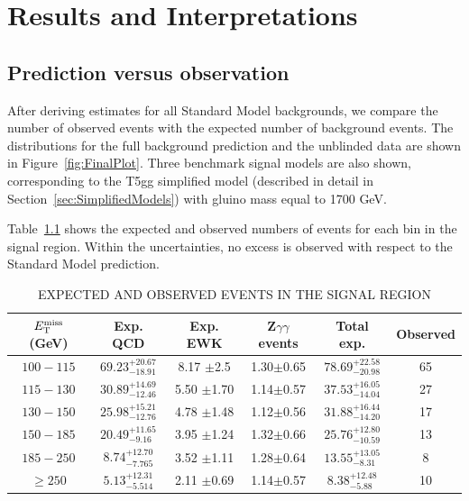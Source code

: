 \chapter{Results and Interpretations}
\label{chap:Results}


\section{Prediction versus observation}
\label{sec:fullCount}
After deriving estimates for all Standard Model backgrounds, we compare the number of 
observed events with the expected number of background events. 
The \ETmiss distributions for the full background prediction and the unblinded data are
shown in Figure~\ref{fig:FinalPlot}. Three benchmark signal models are also shown, 
corresponding to the T5gg simplified model 
(described in detail in Section~\ref{sec:SimplifiedModels}) with gluino mass equal to 1700 GeV.

Table~\ref{tab:ExpObs} shows the expected and observed numbers of events for each bin in the signal region.
Within the uncertainties, no excess is observed with respect to the Standard Model prediction.


\begin{table}[ht]
    \caption{EXPECTED AND OBSERVED EVENTS IN THE SIGNAL REGION}
    \centering
    \begin{tabular}{ |c|c|c|c|c|c|}
        \hline
        $E_{\mathrm{T}}^{\text{miss}}$ (GeV) & Exp. QCD & Exp. EWK &  Z$\gamma\gamma$ events  &Total exp. & Observed \\ [0.5ex]
        \hline
        $100 - 115$ & ${69.23}^{+20.67}_{-18.91}$ & 8.17 $\pm$2.5  & 1.30$\pm$0.65 & ${ 78.69 }^{+ 22.58 }_{- 20.98 }$ & 65  \\
        $115 - 130$ & ${30.89}^{+14.69}_{-12.46}$ & 5.50 $\pm$1.70 & 1.14$\pm$0.57 & ${ 37.53 }^{+ 16.05 }_{- 14.04 }$ & 27 \\
        $130 - 150$ & ${25.98}^{+15.21}_{-12.76}$ & 4.78 $\pm$1.48 & 1.12$\pm$0.56 & ${ 31.88 }^{+ 16.44 }_{- 14.20 }$ & 17 \\
        $150 - 185$ & ${20.49}^{+11.65}_{-9.16} $ & 3.95 $\pm$1.24 & 1.32$\pm$0.66 & ${ 25.76 }^{+ 12.80 }_{- 10.59 }$ & 13 \\
        $185 -  250$& ${8.74} ^{+12.70}_{-7.765}$ & 3.52 $\pm$1.11 & 1.28$\pm$0.64 & ${ 13.55 }^{+ 13.05 }_{- 8.31  }$ & 8  \\
        $\geq 250$  & ${5.13} ^{+12.31}_{-5.514}$ & 2.11 $\pm$0.69 & 1.14$\pm$0.57 & ${ 8.38  }^{+ 12.48 }_{- 5.88  }$ & 10 \\
        \hline
    \end{tabular}
    \label{tab:ExpObs}
\end{table}

